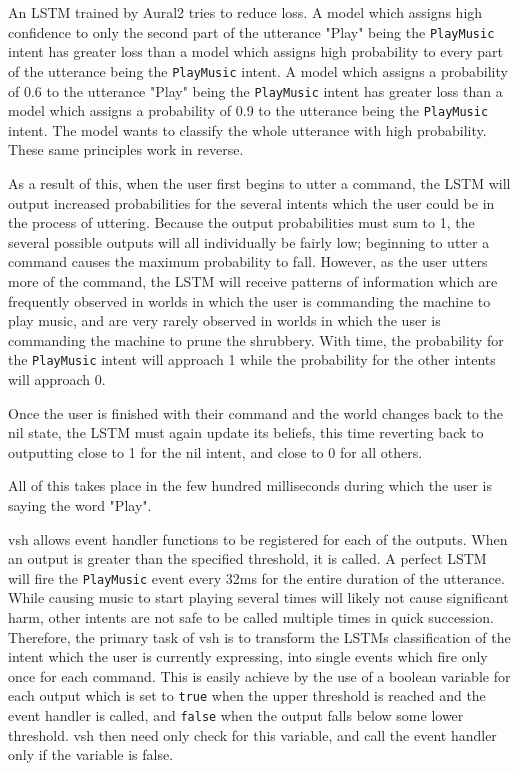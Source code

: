 \documentclass[conference]{IEEEtran}
\begin{document}
An LSTM trained by Aural2 tries to reduce loss.
A model which assigns high confidence to only the second part of the utterance "Play" being the \texttt{PlayMusic} intent has greater loss than a model which assigns high probability to every part of the utterance being the \texttt{PlayMusic} intent.
A model which assigns a probability of 0.6 to the utterance "Play" being the \texttt{PlayMusic} intent has greater loss than a model which assigns a probability of 0.9 to the utterance being the \texttt{PlayMusic} intent.
The model wants to classify the whole utterance with high probability.
These same principles work in reverse.

As a result of this, when the user first begins to utter a command, the LSTM will output increased probabilities for the several intents which the user could be in the process of uttering.
Because the output probabilities must sum to 1, the several possible outputs will all individually be fairly low; beginning to utter a command causes the maximum probability to fall.
However, as the user utters more of the command, the LSTM will receive patterns of information which are frequently observed in worlds in which the user is commanding the machine to play music, and are very rarely observed in worlds in which the user is commanding the machine to prune the shrubbery.
With time, the probability for the \texttt{PlayMusic} intent will approach 1 while the probability for the other intents will approach 0.

Once the user is finished with their command and the world changes back to the nil state, the LSTM must again update its beliefs, this time reverting back to outputting close to 1 for the nil intent, and close to 0 for all others.

All of this takes place in the few hundred milliseconds during which the user is saying the word "Play".

vsh allows event handler functions to be registered for each of the outputs.
When an output is greater than the specified threshold, it is called.
A perfect LSTM will fire the \texttt{PlayMusic} event every 32ms for the entire duration of the utterance.
While causing music to start playing several times will likely not cause significant harm, other intents are not safe to be called multiple times in quick succession.
Therefore, the primary task of vsh is to transform the LSTMs classification of the intent which the user is currently expressing, into single events which fire only once for each command.
This is easily achieve by the use of a boolean variable for each output which is set to \texttt{true} when the upper threshold is reached and the event handler is called, and \texttt{false} when the output falls below some lower threshold.
vsh then need only check for this variable, and call the event handler only if the variable is false.
\end{document}

